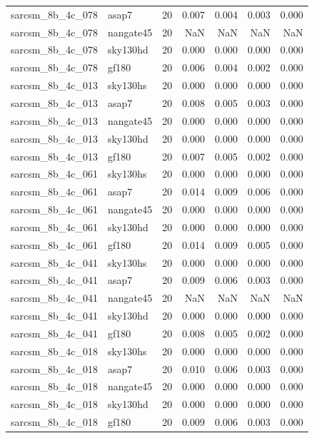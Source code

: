 \begin{tabular}{llrrrrr}
sarcsm\_8b\_4c\_078 & asap7 & 20 & 0.007 & 0.004 & 0.003 & 0.000 \\
sarcsm\_8b\_4c\_078 & nangate45 & 20 & NaN & NaN & NaN & NaN \\
sarcsm\_8b\_4c\_078 & sky130hd & 20 & 0.000 & 0.000 & 0.000 & 0.000 \\
sarcsm\_8b\_4c\_078 & gf180 & 20 & 0.006 & 0.004 & 0.002 & 0.000 \\
sarcsm\_8b\_4c\_013 & sky130hs & 20 & 0.000 & 0.000 & 0.000 & 0.000 \\
sarcsm\_8b\_4c\_013 & asap7 & 20 & 0.008 & 0.005 & 0.003 & 0.000 \\
sarcsm\_8b\_4c\_013 & nangate45 & 20 & 0.000 & 0.000 & 0.000 & 0.000 \\
sarcsm\_8b\_4c\_013 & sky130hd & 20 & 0.000 & 0.000 & 0.000 & 0.000 \\
sarcsm\_8b\_4c\_013 & gf180 & 20 & 0.007 & 0.005 & 0.002 & 0.000 \\
sarcsm\_8b\_4c\_061 & sky130hs & 20 & 0.000 & 0.000 & 0.000 & 0.000 \\
sarcsm\_8b\_4c\_061 & asap7 & 20 & 0.014 & 0.009 & 0.006 & 0.000 \\
sarcsm\_8b\_4c\_061 & nangate45 & 20 & 0.000 & 0.000 & 0.000 & 0.000 \\
sarcsm\_8b\_4c\_061 & sky130hd & 20 & 0.000 & 0.000 & 0.000 & 0.000 \\
sarcsm\_8b\_4c\_061 & gf180 & 20 & 0.014 & 0.009 & 0.005 & 0.000 \\
sarcsm\_8b\_4c\_041 & sky130hs & 20 & 0.000 & 0.000 & 0.000 & 0.000 \\
sarcsm\_8b\_4c\_041 & asap7 & 20 & 0.009 & 0.006 & 0.003 & 0.000 \\
sarcsm\_8b\_4c\_041 & nangate45 & 20 & NaN & NaN & NaN & NaN \\
sarcsm\_8b\_4c\_041 & sky130hd & 20 & 0.000 & 0.000 & 0.000 & 0.000 \\
sarcsm\_8b\_4c\_041 & gf180 & 20 & 0.008 & 0.005 & 0.002 & 0.000 \\
sarcsm\_8b\_4c\_018 & sky130hs & 20 & 0.000 & 0.000 & 0.000 & 0.000 \\
sarcsm\_8b\_4c\_018 & asap7 & 20 & 0.010 & 0.006 & 0.003 & 0.000 \\
sarcsm\_8b\_4c\_018 & nangate45 & 20 & 0.000 & 0.000 & 0.000 & 0.000 \\
sarcsm\_8b\_4c\_018 & sky130hd & 20 & 0.000 & 0.000 & 0.000 & 0.000 \\
sarcsm\_8b\_4c\_018 & gf180 & 20 & 0.009 & 0.006 & 0.003 & 0.000 \\

\end{tabular}
